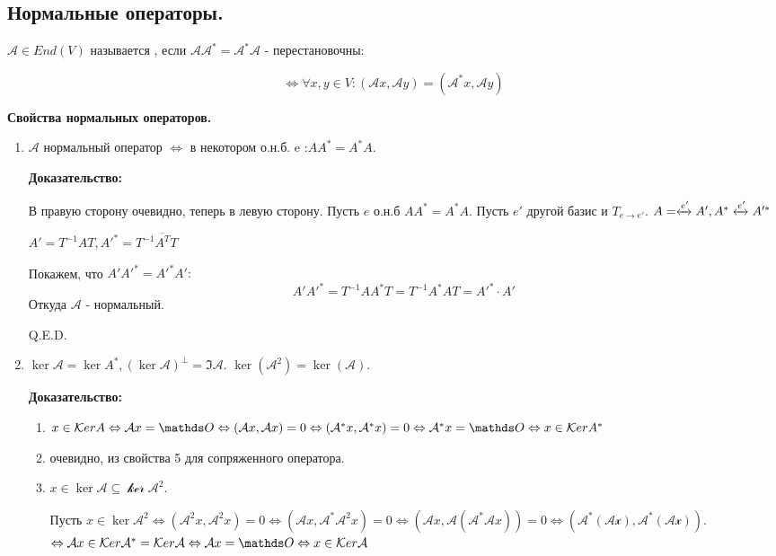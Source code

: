 \newpage
\subsection{Нормальные операторы.}

$\mathcal{A}\in End(V)$ называется , если $\mathcal{A}\mathcal{A}^* = \mathcal{A}^* \mathcal{A}$ - перестановочны:

$$\Leftrightarrow \forall x,y \in V: (\mathcal{A}x, \mathcal{A}y) = (\mathcal{A}^* x, \mathcal{A}y)$$

\textbf{Свойства нормальных операторов.}

\begin{enumerate}
    \item $\mathcal{A}$ нормальный оператор $\Leftrightarrow$ в некотором о.н.б. e :$A A^* = A^*A$.

    \textbf{Доказательство:}

    В правую сторону очевидно, теперь в левую сторону. Пусть $e$ о.н.б $A A^* =A^* A$. Пусть $e'$ другой базис и $T_{e\rightarrow{}e'}$. $A =\xleftrightarrow[]{e'}A', A^* \xleftrightarrow[]{e'}A'^*$

    $A' = T^{-1}AT, A'^* = T^{-1}\overline{A^T}T$

    Покажем, что $A'A'^* = A'^*A':$
    $$A'A'^* = T^{-1}A A^*T = T^{-1}A^*AT = A'^*\cdot A'$$
    Откуда $\mathcal{A}$ - нормальный.
    
    \hfill Q.E.D.

    \item $\ker \mathcal{A} = \ker A^*,(\ker \mathcal{A})^\perp = \Im \mathcal{A}$. $\ker (\mathcal{A}^2)=\ker (\mathcal{A})$.

    \textbf{Доказательство:}

    \begin{enumerate}
        \item $x\in \ker A \Leftrightarrow \mathcal{A}x = \zero \Leftrightarrow (\mathcal{A}x, \mathcal{A}x) = 0 \Leftrightarrow (\mathcal{A}^*x, \mathcal{A}^*x) = 0 \Leftrightarrow \mathcal{A}^*x = \zero \Leftrightarrow x\in \ker A^*$

        \item очевидно, из свойства 5 для сопряженного оператора.
        \item $x\in \ker \mathcal{A}\subseteq \mathcal{\ker A}^2$.

        Пусть $x \in \ker \mathcal{A}^2 \Leftrightarrow (\mathcal{A}^2 x, \mathcal{A}^2x) = 0 \Leftrightarrow (\mathcal{A}x, \mathcal{A}^* \mathcal{A}^2x) = 0 \Leftrightarrow (\mathcal{A}x, \mathcal{A}(\mathcal{A}^*\mathcal{A}x)) = 0 \Leftrightarrow (\mathcal{A^*(\mathcal{Ax}),\mathcal{A}^*(\mathcal{A}x)})$.
        $\Leftrightarrow \mathcal{A}x \in \ker \mathcal{A}^* =\ker \mathcal{A} \Leftrightarrow \mathcal{A}x = \zero \Leftrightarrow x \in \ker \mathcal{A}$
    \end{enumerate}


\end{enumerate}
